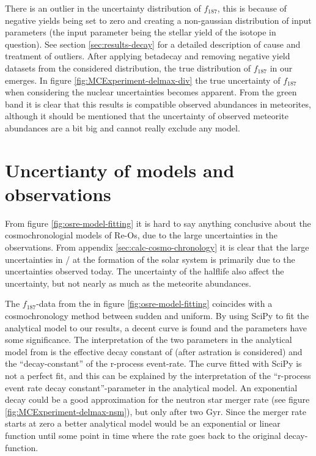 There is an outlier in the uncertainty distribution of $f_{187}$, this is because of negative yields being set to zero and creating a non-gaussian distribution of input parameters (the input parameter being the stellar yield of the isotope in question). See section \ref{sec:results-decay} for a detailed description of cause and treatment of outliers.
After applying betadecay and removing negative yield datasets from the considered distribution, the true distribution of $f_{187}$ in our \fiduccialomega emerges.
In figure \ref{fig:MCExperiment-delmax-div} the true uncertainty of $f_{187}$ when considering the nuclear uncertainties becomes apparent.
From the green band it is clear that this results is compatible observed abundances in meteorites, although it should be mentioned that the uncertainty of observed meteorite abundances are a bit big and cannot really exclude any model.

\section{Uncertianty of models and observations}
From figure \ref{fig:osre-model-fitting} it is hard to say anything conclusive about the cosmochronologial models of Re-Os, due to the large uncertainties in the observations.
From appendix \ref{sec:calc-cosmo-chronology} it is clear that the large uncertainties in / at the formation of the solar system is primarily due to the uncertainties observed today.
The uncertainty of the  halflife also affect the uncertainty, but not nearly as much as the meteorite abundances.

The $f_{187}$-data from the \fiduccialomega in figure \ref{fig:osre-model-fitting} coincides with a cosmochronology method between sudden and uniform.
By using SciPy to fit the analytical model to our results, a decent curve is found and the parameters have some significance.
The interpretation of the two parameters in the analytical model from  is the effective decay constant of  (after astration is considered) and the ``decay-constant'' of the r-process event-rate.
The curve fitted with SciPy is not a perfect fit, and this can be explained by the interpretation of the ``r-process event rate decay constant''-parameter in the analytical model.
An exponential decay could be a good approximation for the neutron star merger rate (see figure \ref{fig:MCExperiment-delmax-nsm}), but only after two Gyr.
Since the merger rate starts at zero a better analytical model would be an exponential or linear function until some point in time where the rate goes back to the original decay-function.

